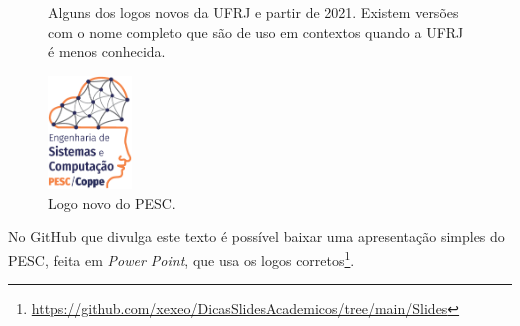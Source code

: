 \begin{figure}[hbt]
    \centering
    \caption{Alguns dos logos novos da  UFRJ e partir de 2021. Existem versões com o nome completo que são de uso em contextos quando a UFRJ é menos conhecida.}
    \label{fig:logoufrj}
\end{figure}

\begin{figure}[hbt]
    \centering
    \includegraphics[height=3cm]{imagens/logoPrincipal.eps}
    \caption{Logo novo do PESC.}
    \label{fig:logopesc}
\end{figure}



No GitHub que divulga este texto é possível baixar uma apresentação simples do PESC, feita em \textit{Power Point}, que usa os logos corretos\footnote{\url{https://github.com/xexeo/DicasSlidesAcademicos/tree/main/Slides}}.



